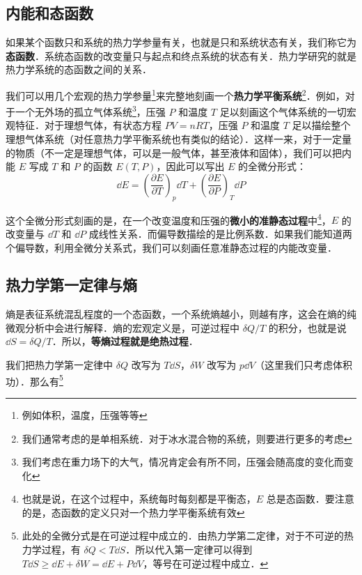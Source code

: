 
\subsection{内能和态函数}
如果某个函数只和系统的热力学参量有关，也就是只和系统状态有关，我们称它为\textbf{态函数}．系统态函数的改变量只与起点和终点系统的状态有关．热力学研究的就是热力学系统的态函数之间的关系．

我们可以用几个宏观的热力学参量\footnote{例如体积，温度，压强等等}来完整地刻画一个\textbf{热力学平衡系统}\footnote{我们通常考虑的是单相系统．对于冰水混合物的系统，则要进行更多的考虑}．例如，对于一个无外场的孤立气体系统\footnote{我们考虑在重力场下的大气，情况肯定会有所不同，压强会随高度的变化而变化}，压强 $P$ 和温度 $T$ 足以刻画这个气体系统的一切宏观特征．对于理想气体，有状态方程 $PV=nRT$，压强 $P$ 和温度 $T$ 足以描绘整个理想气体系统（对任意热力学平衡系统也有类似的结论）．这样一来，对于一定量的物质（不一定是理想气体，可以是一般气体，甚至液体和固体），我们可以把内能 $E$ 写成 $T$ 和 $P$ 的函数 $E(T,P)$，因此可以写出 $E$ 的全微分形式：
\begin{equation}
\dd E=\left(\frac{\partial E}{\partial T}\right)_p \dd T + \left(\frac{\partial E}{\partial P}\right)_T \dd P
\end{equation}

这个全微分形式刻画的是，在一个改变温度和压强的\textbf{微小的准静态过程}中\footnote{也就是说，在这个过程中，系统每时每刻都是平衡态，$E$ 总是态函数．要注意的是，态函数的定义只对一个热力学平衡系统有效}，$E$ 的改变量与 $\dd T$ 和 $\dd P$ 成线性关系．而偏导数描绘的是比例系数．如果我们能知道两个偏导数，利用全微分关系式，我们可以刻画任意准静态过程的内能改变量．

\subsection{热力学第一定律与熵}
熵是表征系统混乱程度的一个态函数，一个系统熵越小，则越有序，这会在熵的纯微观分析中会进行解释．熵的宏观定义是，可逆过程中 $\delta Q/T$ 的积分，也就是说 $\dd S=\delta Q/T$．所以，\textbf{等熵过程就是绝热过程}．

我们把热力学第一定律中 $\delta Q$ 改写为 $T\dd S$，$\delta W$ 改写为 $p\dd V$（这里我们只考虑体积功）．那么有\footnote{
此处的全微分式是在可逆过程中成立的．由热力学第二定律，对于不可逆的热力学过程，有 $\delta Q<T\dd S$．所以代入第一定律可以得到 $T\dd S\ge \dd E+\delta W=\dd E+P\dd V$，等号在可逆过程中成立．
}

